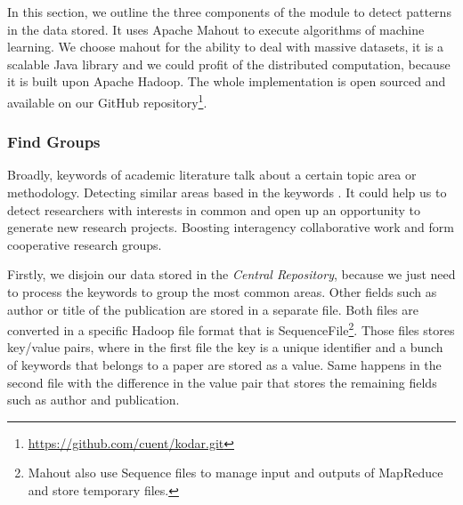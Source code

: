 \documentclass[11pt]{article}
\begin{document}
In this section, we outline the three components of the module to detect patterns in the data stored. It uses Apache Mahout to execute algorithms of machine learning. We choose mahout for the ability to deal with massive datasets, it is a scalable Java library and we could profit of the distributed computation, because it is built upon Apache Hadoop. The whole implementation is open sourced and available on our GitHub repository\footnote{\url{https://github.com/cuent/kodar.git}}. 


\subsubsection{Find Groups}
\label{label:discoversimareas}

Broadly, keywords of academic literature talk about a certain topic area or methodology. Detecting similar areas based in the keywords . It could help us to detect researchers with interests in common and open up an opportunity to generate new research projects. Boosting interagency collaborative work and form cooperative research groups.

Firstly, we disjoin our data stored in the \emph{Central Repository}, because we just need to process the keywords to group the most common areas. Other fields such as author or title of the publication are stored in a separate file. Both files are converted in a specific Hadoop file format that is SequenceFile\footnote{Mahout also use Sequence files to manage input and outputs of MapReduce and store temporary files.}. Those files stores key/value pairs, where in the first file the key is a unique identifier and a bunch of keywords that belongs to a paper are stored as a value. Same happens in the second file with the difference in the value pair that stores the remaining fields such as author and publication. 
\end{document}
